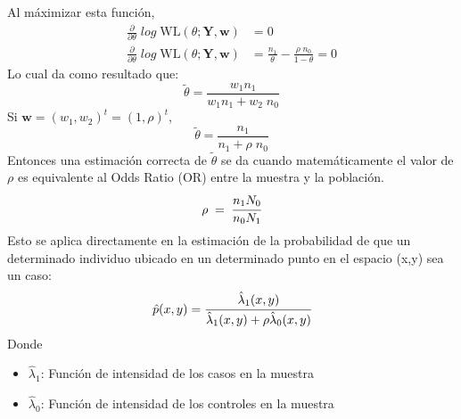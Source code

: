 Al máximizar esta función,
\begin{align*}
\frac{\partial}{\partial \theta} \; log\; \mathrm{WL} (\theta;\textbf{Y},\textbf{w}) &= 0\\
\frac{\partial}{\partial \theta} \; log\; \mathrm{WL} (\theta;\textbf{Y},\textbf{w}) &= \frac{n_1}{\theta}  - \frac{\rho \; n_0}{1-\theta} = 0
\end{align*}
Lo cual da como resultado que:
\begin{equation*}
    \tilde{\theta} = \frac{w_1 n_1}{w_1 n_1 + w_2 \; n_0}
\end{equation*}
Si $\textbf{w}=(w_1,w_2)^t=(1,\rho)^t$,
\begin{equation}
    \tilde{\theta} = \frac{n_1}{n_1 + \rho \; n_0}
\end{equation}
Entonces una estimación correcta de $\tilde{\theta}$ se da cuando matemáticamente el valor de $\rho$ es equivalente al Odds Ratio (OR) entre la muestra y la población.
\begin{equation} \label{rho}
    \rho \; = \; \cfrac{n_1N_0}{n_0N_1}
\end{equation}
Esto se aplica directamente en la estimación de la probabilidad de que un determinado individuo ubicado en un determinado punto en el espacio (x,y) sea un caso:
\begin{equation} \label{intesidad_rho}
    \hat{p}(x,y) = \cfrac{\hat{\lambda}_1(x,y)}{\hat{\lambda}_1(x,y)+ \rho \hat{\lambda}_0(x,y)}
\end{equation}
Donde
\begin{itemize}[noitemsep,nolistsep]
    \item[] $\hat{\lambda}_1$: Función de intensidad de los casos en la muestra
    \item[] $\hat{\lambda}_0$: Función de intensidad de los controles en la muestra
\end{itemize}


